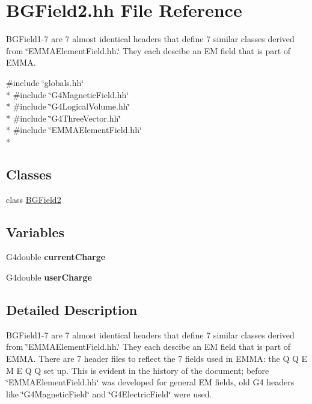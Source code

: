 \hypertarget{BGField2_8hh}{\section{B\-G\-Field2.\-hh File Reference}
\label{BGField2_8hh}
}


B\-G\-Field1-\/7 are 7 almost identical headers that define 7 similar classes derived from \char`\"{}\-E\-M\-M\-A\-Element\-Field.\-hh.\char`\"{} They each descibe an E\-M field that is part of E\-M\-M\-A.  


{\ttfamily \#include \char`\"{}globals.\-hh\char`\"{}}\\*
{\ttfamily \#include \char`\"{}G4\-Magnetic\-Field.\-hh\char`\"{}}\\*
{\ttfamily \#include \char`\"{}G4\-Logical\-Volume.\-hh\char`\"{}}\\*
{\ttfamily \#include \char`\"{}G4\-Three\-Vector.\-hh\char`\"{}}\\*
{\ttfamily \#include \char`\"{}E\-M\-M\-A\-Element\-Field.\-hh\char`\"{}}\\*
\subsection*{Classes}
\begin{DoxyCompactItemize}
\item 
class \hyperlink{classBGField2}{B\-G\-Field2}
\end{DoxyCompactItemize}
\subsection*{Variables}
\begin{DoxyCompactItemize}
\item 
\hypertarget{BGField2_8hh_acb265d8eecfa1acd31056f0c7915362e}{G4double {\bfseries current\-Charge}}\label{BGField2_8hh_acb265d8eecfa1acd31056f0c7915362e}

\item 
\hypertarget{BGField2_8hh_a2d61cdd1b1b5ed409f7c91b54737c1b9}{G4double {\bfseries user\-Charge}}\label{BGField2_8hh_a2d61cdd1b1b5ed409f7c91b54737c1b9}

\end{DoxyCompactItemize}


\subsection{Detailed Description}
B\-G\-Field1-\/7 are 7 almost identical headers that define 7 similar classes derived from \char`\"{}\-E\-M\-M\-A\-Element\-Field.\-hh.\char`\"{} They each descibe an E\-M field that is part of E\-M\-M\-A. There are 7 header files to reflect the 7 fields used in E\-M\-M\-A\-: the Q Q E M E Q Q set up. This is evident in the history of the document; before \char`\"{}\-E\-M\-M\-A\-Element\-Field.\-hh\char`\"{} was developed for general E\-M fields, old G4 headers like \char`\"{}\-G4\-Magnetic\-Field\char`\"{} and \char`\"{}\-G4\-Electric\-Field\char`\"{} were used. 